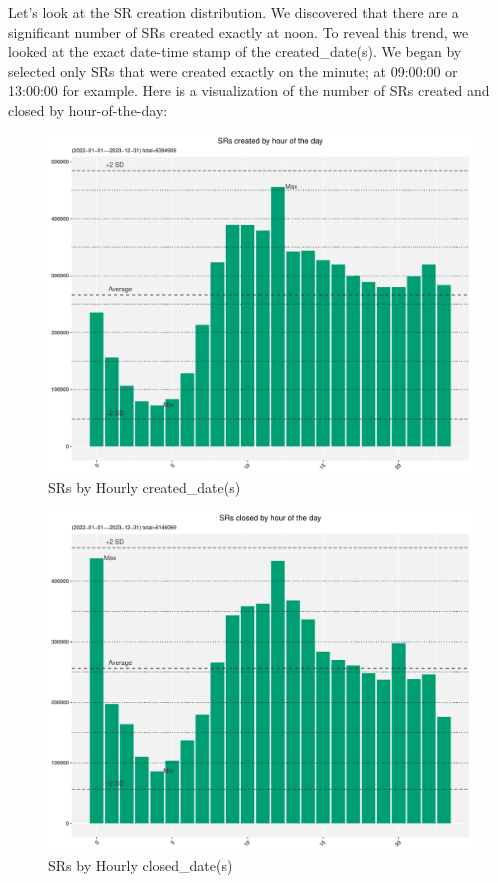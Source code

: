 \documentclass[12pt, titlepage]{article}
\begin{document}
	Let's look at the SR creation distribution. We discovered that there 
	are a significant number of SRs created exactly at noon. To reveal this trend, 
	we looked at the exact date-time stamp of the created\_date(s). We began 
	by selected only SRs that were created exactly on the minute; at 09:00:00 
	or 13:00:00 for example.  Here is a visualization of the number of SRs 
	created and closed by hour-of-the-day:
	
	\begin{figure}[tbp]
		\centering
		\includegraphics[width = \textwidth]{Created_Hourly_SR_count.pdf}
		\caption{SRs by Hourly created\_date(s)}
		\label{fig:hourly-created}
	\end{figure}	
	
	\begin{figure}[tbp]
		\centering
		\includegraphics[width = \textwidth]{Closed_Hourly_SR_count.pdf}
		\caption{SRs by Hourly closed\_date(s)}
		\label{fig:hourly-closed}
	\end{figure}	
	
\end{document}
